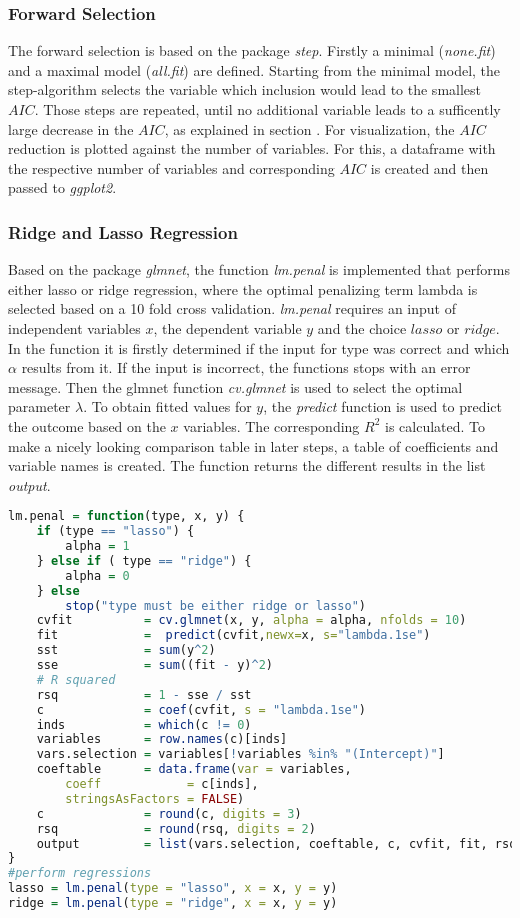 \subsubsection{Forward Selection}
The forward selection is based on the package \textit{step}. Firstly a minimal (\textit{none.fit}) and a maximal model (\textit{all.fit}) are defined. Starting from the minimal model, the step-algorithm selects the variable which inclusion would lead to the smallest $AIC$. Those steps are repeated, until no additional variable leads to a sufficently large decrease in the $AIC$, as explained in section  . 
For visualization, the $AIC$ reduction is plotted against the number of variables. For this, a dataframe with the respective number of variables and corresponding $AIC$ is created and then passed to \textit{ggplot2}.


\subsubsection{Ridge and Lasso Regression}
Based on the package \textit{glmnet}, the function \textit{lm.penal} is implemented  that performs either lasso or ridge regression, where the optimal penalizing term lambda is selected based on a 10 fold cross validation. \textit{lm.penal} requires an input of independent variables $x$, the dependent variable $y$ and the choice $lasso$ or $ridge$. In the function it is firstly determined if the input for type was correct and which $\alpha$ results from it. If the input is incorrect, the functions stops with an error message.
Then the glmnet function \textit{cv.glmnet} is used to select the optimal parameter $\lambda$. To obtain fitted values for $y$,  the \textit{predict} function is used  to predict the outcome based on the $x$ variables. The corresponding $R^{2}$ is calculated.
To make a nicely looking comparison table in later steps, a table of coefficients and variable names is created. The function returns the different results in the list \textit{output}.
\begin{lstlisting}[language=R]
lm.penal = function(type, x, y) {
    if (type == "lasso") {
        alpha = 1
    } else if ( type == "ridge") {
        alpha = 0
    } else
        stop("type must be either ridge or lasso")
    cvfit          = cv.glmnet(x, y, alpha = alpha, nfolds = 10)
    fit            =  predict(cvfit,newx=x, s="lambda.1se")
    sst            = sum(y^2)
    sse            = sum((fit - y)^2)
    # R squared
    rsq            = 1 - sse / sst
    c              = coef(cvfit, s = "lambda.1se")
    inds           = which(c != 0)
    variables      = row.names(c)[inds]
    vars.selection = variables[!variables %in% "(Intercept)"]
    coeftable      = data.frame(var = variables,
        coeff            = c[inds],
        stringsAsFactors = FALSE)
    c              = round(c, digits = 3)
    rsq            = round(rsq, digits = 2)
    output         = list(vars.selection, coeftable, c, cvfit, fit, rsq)
}
#perform regressions
lasso = lm.penal(type = "lasso", x = x, y = y)
ridge = lm.penal(type = "ridge", x = x, y = y)
\end{lstlisting}


